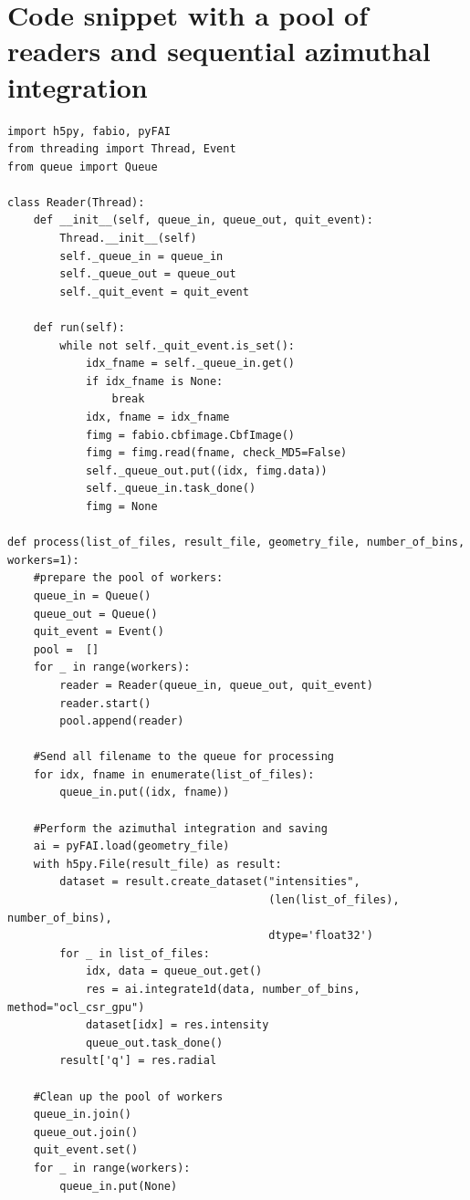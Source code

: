 \documentclass[preprint]{iucr}              %
\begin{document}
\goodbreak

\section{Code snippet with a pool of readers and sequential azimuthal
integration}
\begin{minipage}{\linewidth}
\label{poolsnippet}
\begin{verbatim}
import h5py, fabio, pyFAI
from threading import Thread, Event
from queue import Queue

class Reader(Thread):
    def __init__(self, queue_in, queue_out, quit_event):
        Thread.__init__(self)
        self._queue_in = queue_in
        self._queue_out = queue_out
        self._quit_event = quit_event

    def run(self):
        while not self._quit_event.is_set():
            idx_fname = self._queue_in.get()
            if idx_fname is None:
                break
            idx, fname = idx_fname
            fimg = fabio.cbfimage.CbfImage()
            fimg = fimg.read(fname, check_MD5=False)
            self._queue_out.put((idx, fimg.data))
            self._queue_in.task_done()
            fimg = None

def process(list_of_files, result_file, geometry_file, number_of_bins, workers=1):   
    #prepare the pool of workers:
    queue_in = Queue()
    queue_out = Queue()
    quit_event = Event()
    pool =  []
    for _ in range(workers):
        reader = Reader(queue_in, queue_out, quit_event)
        reader.start()
        pool.append(reader)
    
    #Send all filename to the queue for processing
    for idx, fname in enumerate(list_of_files):
        queue_in.put((idx, fname))

    #Perform the azimuthal integration and saving
    ai = pyFAI.load(geometry_file)
    with h5py.File(result_file) as result:
        dataset = result.create_dataset("intensities", 
                                        (len(list_of_files), number_of_bins),
                                        dtype='float32') 
        for _ in list_of_files:
            idx, data = queue_out.get()
            res = ai.integrate1d(data, number_of_bins, method="ocl_csr_gpu")
            dataset[idx] = res.intensity
            queue_out.task_done()
        result['q'] = res.radial
        
    #Clean up the pool of workers
    queue_in.join()
    queue_out.join()
    quit_event.set()
    for _ in range(workers):
        queue_in.put(None)
\end{verbatim}
\end{minipage}
\end{document}
